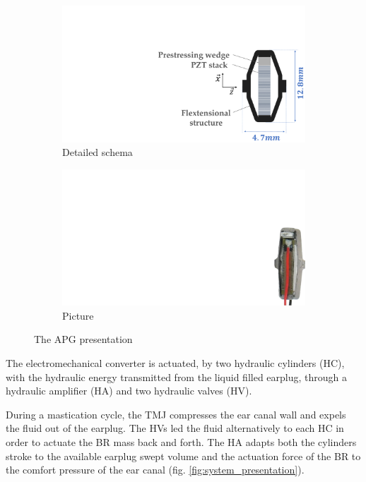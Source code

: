 \documentclass[3p,twocolumn,preprint]{elsarticle}
\def \hfillx {\hspace*{ -\linewidth} \hfill} %
\begin{document}
\begin{figure}[!htb]
	\begin{center}
		\begin{subfigure}[t]{0.5\linewidth}
			\captionsetup{justification=centering}
			\includegraphics[trim={13cm 0cm 0cm 6cm},clip,width=\linewidth]{figures/APG_schema.pdf}
			\caption{Detailed schema}
			\label{fig:APG_schema}
		\end{subfigure}
		\hfillx
		\begin{subfigure}[t]{0.21\linewidth}
			\captionsetup{justification=centering}
			\includegraphics[trim={29.5cm 0cm 0cm 8cm},clip,width=0.65\linewidth]{figures/APG_photo.pdf}
			\caption{Picture}
			\label{fig:APG_photo}
		\end{subfigure}
		\caption{The APG presentation}
		\label{fig:APG}
	\end{center}
\end{figure}

The electromechanical converter is actuated, by two hydraulic cylinders (HC), with the hydraulic energy transmitted from the liquid filled earplug, through a hydraulic amplifier (HA) and two hydraulic valves (HV).

During a mastication cycle, the TMJ compresses the ear canal wall and expels the fluid out of the earplug. The HVs led the fluid alternatively to each HC in order to actuate the BR mass back and forth. The HA adapts both the cylinders stroke to the available earplug swept volume and the actuation force of the BR to the comfort pressure of the ear canal (fig. \ref{fig:system_presentation}).
\end{document}
